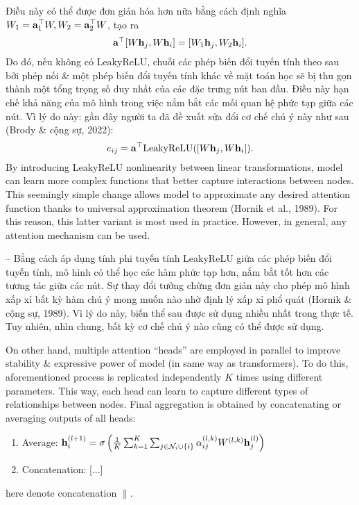 \documentclass{article}
\begin{document}
\begin{itemize}
\begin{itemize}
\begin{itemize}
\begin{equation*}
            \end{equation*}
            Điều này có thể được đơn giản hóa hơn nữa bằng cách định nghĩa $W_1 = {\bf a}_1^\top W,W_2 = {\bf a}_2^\top W$, tạo ra
            \begin{equation*}
                {\bf a}^\top[W{\bf h}_j,W{\bf h}_i] = [W_1{\bf h}_j,W_2{\bf h}_i].
            \end{equation*}
            Do đó, nếu không có LeakyReLU, chuỗi các phép biến đổi tuyến tính theo sau bởi phép nối \& một phép biến đổi tuyến tính khác về mặt toán học sẽ bị thu gọn thành một tổng trọng số duy nhất của các đặc trưng nút ban đầu. Điều này hạn chế khả năng của mô hình trong việc nắm bắt các mối quan hệ phức tạp giữa các nút. Vì lý do này: gần đây người ta đã đề xuất sửa đổi cơ chế chú ý này như sau (Brody \& cộng sự, 2022):
            \begin{equation*}
                e_{ij} = {\bf a}^\top{\rm LeakyReLU}([W{\bf h}_j,W{\bf h}_i]).
            \end{equation*}
            By introducing LeakyReLU nonlinearity between linear transformations, model can learn more complex functions that better capture interactions between nodes. This seemingly simple change allows model to approximate any desired attention function thanks to universal approximation theorem (Hornik et al., 1989). For this reason, this latter variant is most used in practice. However, in general, any attention mechanism can be used.

            -- Bằng cách áp dụng tính phi tuyến tính LeakyReLU giữa các phép biến đổi tuyến tính, mô hình có thể học các hàm phức tạp hơn, nắm bắt tốt hơn các tương tác giữa các nút. Sự thay đổi tưởng chừng đơn giản này cho phép mô hình xấp xỉ bất kỳ hàm chú ý mong muốn nào nhờ định lý xấp xỉ phổ quát (Hornik \& cộng sự, 1989). Vì lý do này, biến thể sau được sử dụng nhiều nhất trong thực tế. Tuy nhiên, nhìn chung, bất kỳ cơ chế chú ý nào cũng có thể được sử dụng.

            On other hand, multiple attention ``heads'' are employed in parallel to improve stability \& expressive power of model (in same way as transformers). To do this, aforementioned process is replicated independently $K$ times using different parameters. This way, each head can learn to capture different types of relationships between nodes. Final aggregation is obtained by concatenating or averaging outputs of all heads:
            \begin{enumerate}
                \item Average: ${\bf h}_i^{(l + 1)} = \sigma\left(\frac{1}{K}\sum_{k=1}^K\sum_{j\in{\cal N}_i\cup\{i\}} \alpha_{ij}^{(l,k)}W^{(l,k)}{\bf h}_j^{(l)}\right)$
                \item Concatenation: [...]
            \end{enumerate}
            here denote concatenation $\parallel$.


\end{itemize}
\end{itemize}
\end{itemize}
\end{document}
